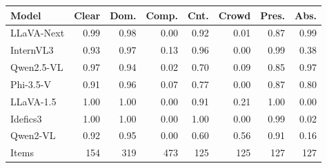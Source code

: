 \setlength{\tabcolsep}{2.5pt}
\footnotesize
\begin{tabular}{lrrrrrrr}
\toprule
Model & Clear & Dom. & Comp. & Cnt. & Crowd & Pres. & Abs. \\
\midrule
LLaVA-Next & 0.99 & 0.98 & 0.00 & 0.92 & 0.01 & 0.87 & 0.99 \\
InternVL3 & 0.93 & 0.97 & 0.13 & 0.96 & 0.00 & 0.99 & 0.38 \\
Qwen2.5-VL & 0.97 & 0.94 & 0.02 & 0.70 & 0.09 & 0.85 & 0.97 \\
Phi-3.5-V & 0.91 & 0.96 & 0.07 & 0.77 & 0.00 & 0.87 & 0.80 \\
LLaVA-1.5 & 1.00 & 1.00 & 0.00 & 0.91 & 0.21 & 1.00 & 0.00 \\
Idefics3 & 1.00 & 1.00 & 0.00 & 1.00 & 0.00 & 0.99 & 0.02 \\
Qwen2-VL & 0.92 & 0.95 & 0.00 & 0.60 & 0.56 & 0.91 & 0.16 \\
\midrule
Items & 154 & 319 & 473 & 125 & 125 & 127 & 127 \\
\bottomrule
\end{tabular}
